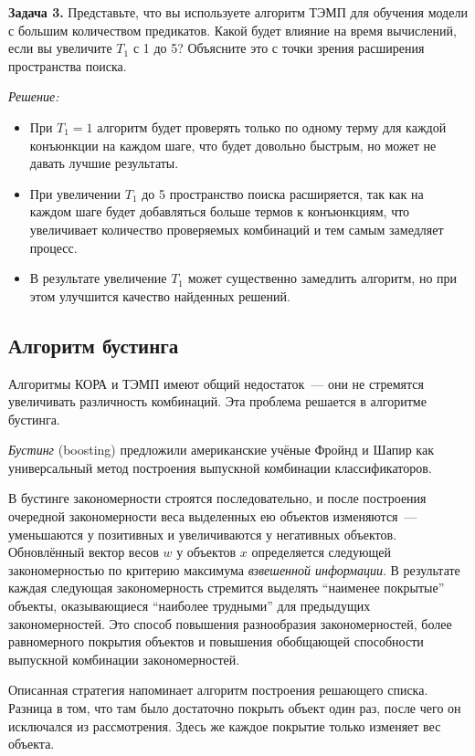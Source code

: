 \begin{itemize}
\textbf{Задача 3.}
\newline
Представьте, что вы используете алгоритм ТЭМП для обучения модели с большим количеством предикатов. Какой будет влияние на время вычислений, если вы увеличите $T_1$ с 1 до 5? Объясните это с точки зрения расширения пространства поиска.

\textit{Решение:}
\begin{itemize}
    \item При $T_1 = 1$ алгоритм будет проверять только по одному терму для каждой конъюнкции на каждом шаге, что будет довольно быстрым, но может не давать лучшие результаты.
    \item При увеличении $T_1$ до 5 пространство поиска расширяется, так как на каждом шаге будет добавляться больше термов к конъюнкциям, что увеличивает количество проверяемых комбинаций и тем самым замедляет процесс.
    \item В результате увеличение $T_1$ может существенно замедлить алгоритм, но при этом улучшится качество найденных решений.
\end{itemize}


\subsection*{Алгоритм бустинга}

Алгоритмы КОРА и ТЭМП имеют общий недостаток~--- они не стремятся увеличивать различность комбинаций. Эта проблема решается в алгоритме бустинга.

\textit{Бустинг} (boosting) предложили американские учёные Фройнд и Шапир как универсальный метод построения выпускной комбинации классификаторов. 

В бустинге закономерности строятся последовательно, и после построения очередной закономерности веса выделенных ею объектов изменяются~--- уменьшаются у позитивных и увеличиваются у негативных объектов. Обновлённый вектор весов $w$ у объектов $x$ определяется следующей закономерностью по критерию максимума \textit{взвешенной информации}. В результате каждая следующая закономерность стремится выделять ``наименее покрытые'' объекты, оказывающиеся ``наиболее трудными'' для предыдущих закономерностей. Это способ повышения разнообразия закономерностей, более равномерного покрытия объектов и повышения обобщающей способности выпускной комбинации закономерностей.

Описанная стратегия напоминает алгоритм построения решающего списка. Разница в том, что там было достаточно покрыть объект один раз, после чего он исключался из рассмотрения. Здесь же каждое покрытие только изменяет вес объекта.


\end{itemize}
